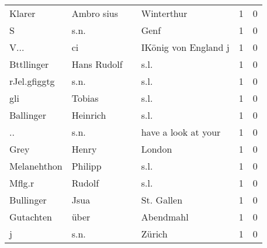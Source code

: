 \documentclass[10pt,a4paper,landscape]{article}
\begin{document}
\begin{longtable}{llllrr}
                   Klarer &                         Ambro sius &             &                                  Winterthur &          1 &         0 \\
                        S &                               s.n. &             &                                        Genf &          1 &         0 \\
                     V... &                                 ci &             &                        IKönig von England j &          1 &         0 \\
               Bttllinger &                        Hans Rudolf &             &                                        s.l. &          1 &         0 \\
             rJel.gfiggtg &                               s.n. &             &                                        s.l. &          1 &         0 \\
                      gli &                             Tobias &             &                                        s.l. &          1 &         0 \\
                Ballinger &                           Heinrich &             &                                        s.l. &          1 &         0 \\
                       .. &                               s.n. &             &                         have a look at your &          1 &         0 \\
                     Grey &                              Henry &             &                                      London &          1 &         0 \\
              Melanehthon &                            Philipp &             &                                        s.l. &          1 &         0 \\
                   Mflg.r &                             Rudolf &             &                                        s.l. &          1 &         0 \\
                Bullinger &                               Jsua &             &                                  St. Gallen &          1 &         0 \\
                Gutachten &                               über &             &                                   Abendmahl &          1 &         0 \\
                        j &                               s.n. &             &                                      Zürich &          1 &         0 \\

\end{longtable}
\end{document}
